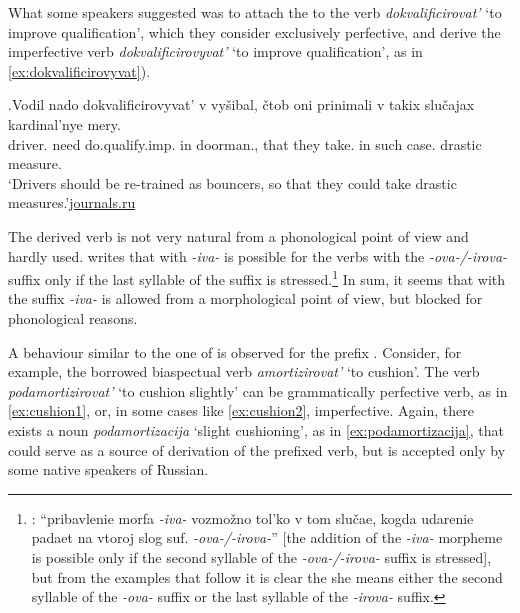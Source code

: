 What some speakers suggested was to attach the  to the verb \textit{dokvalificirovat'} `to improve qualification', which they consider exclusively perfective, and derive the imperfective verb \textit{dokvalificirovyvat'} `to improve qualification', as in \ref{ex:dokvalificirovyvat}). 

\exg.\label{ex:dokvalificirovyvat}Vodil nado dokvalificirovyvat' v vy\v{s}ibal, \v{c}tob oni prinimali v takix slu\v{c}ajax kardinal'nye mery.\\
driver. need do.qualify.imp. in doorman., that they take. in such case. drastic measure.\\
\trans `Drivers should be re-trained as bouncers, so that they could take drastic measures.'\hbox{}\hfill\hbox{\url{journals.ru}}

The derived verb is not very natural from a phonological point of view and hardly used. \citet[590]{Shvedova:82} writes that  with \textit{-iva-} is possible for the verbs with the \textit{-ova-/-irova-} suffix only if the last syllable of the suffix is stressed.\footnote{\citet[590]{Shvedova:82}: ``pribavlenie morfa \textit{-­iva-} vozmo\v{z}no tol'ko v tom slu\v{c}ae, kogda udarenie padaet na vtoroj slog suf. \textit{-­ova-/-irova-}'' [the addition of the \textit{-iva-} morpheme is possible only if the second syllable of the \textit{-­ova-/-irova-} suffix is stressed], but from the examples that follow it is clear the she means either the second syllable of the \textit{-ova-} suffix or the last syllable of the \textit{-irova-} suffix.} In sum, it seems that  with the suffix \textit{-iva-} is allowed from a morphological point of view, but blocked for phonological reasons.
 
A behaviour similar to the one of  is observed for the prefix . Consider, for example, the borrowed biaspectual verb \textit{amortizirovat'} `to cushion'. The verb \textit{podamortizirovat'} `to cushion slightly' can be grammatically perfective verb, as in \ref{ex:cushion1}, or, in some cases like \ref{ex:cushion2}, imperfective. Again, there exists a noun \textit{podamortizacija} `slight cushioning', as in \ref{ex:podamortizacija}, that could serve as a source of derivation of the prefixed verb, but is accepted only by some native speakers of Russian.

